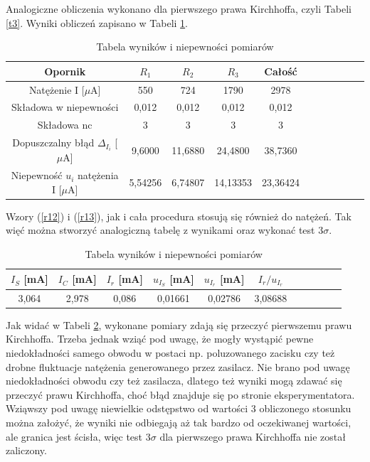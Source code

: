 \documentclass[10pt,a4paper]{article}
\begin{document}
Analogiczne obliczenia wykonano dla pierwszego prawa Kirchhoffa, czyli Tabeli \ref{t3}. Wyniki obliczeń zapisano w Tabeli \ref{t8}.
 \begin{center}
 \begin{table}[h!]
 \centering
 \caption{Tabela wyników i niepewności pomiarów}
 \label{t8}
 \begin{tabular}{|c|c|c|c|c|c|c|c|c|c|c|}
 \hline
 Opornik&$R_{1}$& $R_{2}$&$R_{3}$ &Całość \\
 \hline
Natężenie I [$\mu$A]&550 &724&1790&2978 \\
 \hline 
 Składowa w niepewności&0,012&0,012&0,012&0,012\\
 \hline
 Składowa nc&3&3&3&3\\
 \hline
 Dopuszczalny błąd $\Delta_{I_{i}}$ [$\mu$A]&9,6000&11,6880&24,4800&38,7360\\
 \hline
 Niepewność $u_{i}$ natężenia I [$\mu$A] &5,54256&6,74807&14,13353&23,36424\\
 \hline
 \end{tabular}
 \end{table}
 \end{center}
Wzory (\ref{r12}) i (\ref{r13}), jak i cała procedura stosują się również do natężeń. Tak więć można stworzyć analogiczną tabelę z wynikami oraz wykonać test $3\sigma$.
\begin{center}
\begin{table}[h!]
 \centering
 \caption{Tabela wyników i niepewności pomiarów}
 \label{t9}
 \begin{tabular}{|c|c|c|c|c|c|c|c|c|c|c|}
 \hline
 $I_{S}$ [mA]&$I_{C}$ [mA]& $I_{r}$ [mA]&$u_{I_{S}}$ [mA] &$u_{I_{r}}$ [mA]& $I_{r}/u_{I_{r}}$ \\
 \hline
 3,064&2,978&0,086&0,01661&0,02786&3,08688\\
 \hline
 \end{tabular}
 \end{table}
 \end{center}
 Jak widać w Tabeli \ref{t9}, wykonane pomiary zdają się przeczyć pierwszemu prawu Kirchhoffa. Trzeba jednak wziąć pod uwagę, że mogły wystąpić pewne niedokładności samego obwodu w postaci np. poluzowanego zacisku czy też drobne fluktuacje natężenia   generowanego przez zasilacz. Nie brano pod uwagę niedokładności obwodu czy też zasilacza, dlatego też wyniki mogą zdawać się przeczyć prawu Kirchhoffa, choć błąd znajduje się po stronie eksperymentatora. Wziąwszy pod uwagę niewielkie odstępstwo od wartości 3 obliczonego stosunku można założyć, że wyniki nie odbiegają aż tak bardzo od oczekiwanej wartości, ale granica jest ścisła, więc test $3\sigma$ dla pierwszego prawa Kirchhoffa nie został zaliczony.  
 
\end{document}
